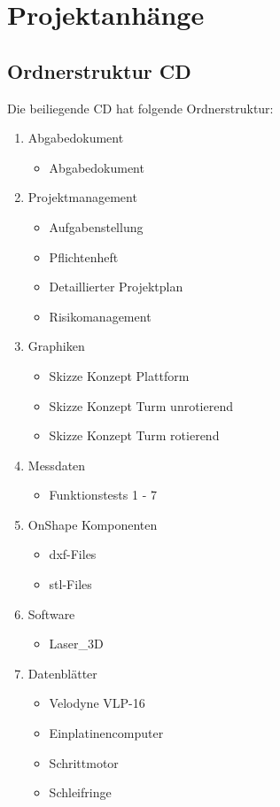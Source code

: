 
\appendix

\chapter{Projektanhänge}
\label{Anhang}
\section{Ordnerstruktur CD}

Die beiliegende CD hat folgende Ordnerstruktur:

\begin{enumerate}
	\item Abgabedokument
	\begin{itemize}
		\item Abgabedokument
	\end{itemize}
	\item Projektmanagement
	\begin{itemize}
		\item Aufgabenstellung
		\item Pflichtenheft
		\item Detaillierter Projektplan
		\item Risikomanagement
	\end{itemize}
	\item Graphiken
	\begin{itemize}
		\item Skizze Konzept Plattform
		\item Skizze Konzept Turm unrotierend
		\item Skizze Konzept Turm rotierend
	\end{itemize}
	\item Messdaten
	\begin{itemize}
		\item Funktionstests 1 - 7
	\end{itemize}
	\item OnShape Komponenten
	\begin{itemize}
		\item dxf-Files
		\item stl-Files
	\end{itemize}
	\item Software
		\begin{itemize}
	\item Laser\_3D
	\end{itemize}
		\item Datenblätter
	\begin{itemize}
		\item Velodyne VLP-16
		\item Einplatinencomputer
		\item Schrittmotor
		\item Schleifringe
	\end{itemize}
\end{enumerate}

	\newpage



